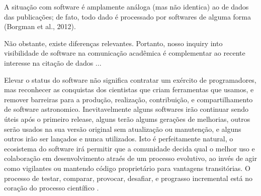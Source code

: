 A situação com software é amplamente análoga (mas não identica) ao de dados
das publicações; de fato, todo dado é processado por softwares de alguma forma
(Borgman et al., 2012).

Não obstante, existe diferenças relevantes. Portanto, nosso inquiry into visibilidade
de software na comunicação acadêmica é complementar ao recente interesse
na citação de dados ...

\cite{howison2016software}


Elevar o status do software não significa contratar um exército de programadores,
mas reconhecer as conquistas dos cientistas que criam ferramentas que usamos,
e remover barreiras para a produção, realização, contribuição, e compartilhamento de software astronomico.
Inevitavelmente alguns softwares irão continuar sendo úteis após o primeiro release,
alguns terão algums gerações de melhorias, outros serão usados na sua versão original sem atualização ou manutenção,
e alguns outros irão ser lançados e nunca utilizados. Isto é perfeitamente natural,
o ecosistema do software irá permitir que a comunidade decida qual o melhor uso e
colaboração em desenvolvimento atraés de um processo evolutivo, ao invés de agir como vigilantes
ou mantendo código proprietário para vantagens transitórias. O processo de testar, comparar,
provocar, desafiar, e prograsso incremental está no coração do processo científico 
\cite{weiner2009astronomical}.

